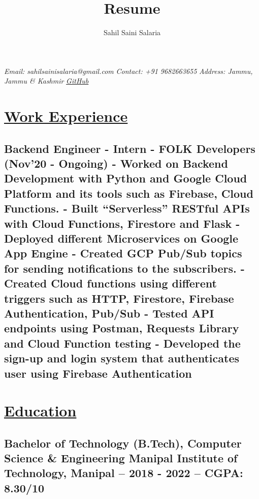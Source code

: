 \documentclass{article}
\makeatletter
\renewcommand{\maketitle}{
    \begin{flushleft}        
        {\huge\rmfamily
        \theauthor}\newline
        \vspace{0.1em}
        \textit{Email: sahilsainisalaria@gmail.com }  \newline  
        \textit{Contact: +91 9682663655 }  \newline 
        \textit{Address: Jammu, Jammu \& Kashmir }  \newline 
        \textit{ \href{https://github.com/sahil1515}{GitHub}}  \newline 
    \end{flushleft}
}
\makeatother
\begin{document}
\begin{multicols}{2}
    \title{Resume}
    \author{Sahil Saini Salaria}
    \maketitle


\end{multicols}


\section{\underline{Work Experience}}

\subsection{\textbf{Backend Engineer - Intern}
    \textmd{- FOLK Developers (Nov'20 - Ongoing)}\newline
    \textmd{- Worked on Backend Development with Python and Google Cloud Platform and its tools such as Firebase, Cloud Functions. }\newline
    \textmd{- Built “Serverless” RESTful APIs with Cloud Functions, Firestore and Flask}\newline
    \textmd{- Deployed different Microservices on Google App Engine}\newline
    \textmd{- Created GCP Pub/Sub topics for sending notifications to the subscribers.}\newline
    \textmd{- Created Cloud functions using different triggers such as HTTP, Firestore, Firebase Authentication, Pub/Sub}\newline
    \textmd{- Tested API endpoints using Postman, Requests Library and Cloud Function testing}\newline
    \textmd{- Developed the sign-up and login system that authenticates user using Firebase Authentication}\newline
}

\section{\underline{Education}}

\subsection{\textbf{Bachelor of Technology (B.Tech), Computer Science \& Engineering}\newline
    \textmd{Manipal Institute of Technology, Manipal --  2018 - 2022 -- CGPA: 8.30/10}}
\end{document}
